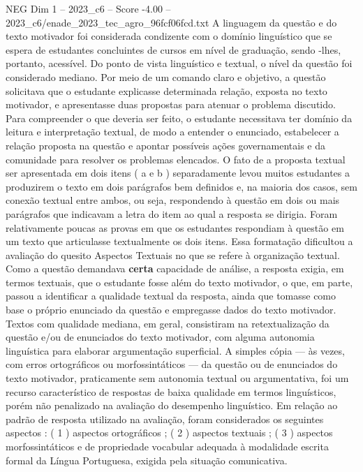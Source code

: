 \begin{textsample}{NEG Dim 1 – 2023\_c6 – Score -4.00 – 2023\_c6/enade\_2023\_tec\_agro\_96fcf06fcd.txt}
A linguagem da questão e do texto motivador foi considerada condizente com o domínio linguístico que se espera de estudantes concluintes de cursos em nível de graduação, sendo -lhes, portanto, acessível.
Do ponto de vista linguístico e textual, o nível da questão foi considerado mediano.
Por meio de um comando claro e objetivo, a questão solicitava que o estudante explicasse determinada relação, exposta no texto motivador, e apresentasse duas propostas para atenuar o problema discutido.
Para compreender o que deveria ser feito, o estudante necessitava ter domínio da leitura e interpretação textual, de modo a entender o enunciado, estabelecer a relação proposta na questão e apontar possíveis ações governamentais e da comunidade para resolver os problemas elencados.
O fato de a proposta textual ser apresentada em dois itens ( a e b ) separadamente levou muitos estudantes a produzirem o texto em dois parágrafos bem definidos e, na maioria dos casos, sem conexão textual entre ambos, ou seja, respondendo à questão em dois ou mais parágrafos que indicavam a letra do item ao qual a resposta se dirigia.
Foram relativamente poucas as provas em que os estudantes respondiam à questão em um texto que articulasse textualmente os dois itens.
Essa formatação dificultou a avaliação do quesito Aspectos Textuais no que se refere à organização textual.
Como a questão demandava \textbf{certa} capacidade de análise, a resposta exigia, em termos textuais, que o estudante fosse além do texto motivador, o que, em parte, passou a identificar a qualidade textual da resposta, ainda que tomasse como base o próprio enunciado da questão e empregasse dados do texto motivador.
Textos com qualidade mediana, em geral, consistiram na retextualização da questão e/ou de enunciados do texto motivador, com alguma autonomia linguística para elaborar argumentação superficial.
A simples cópia — às vezes, com erros ortográficos ou morfossintáticos — da questão ou de enunciados do texto motivador, praticamente sem autonomia textual ou argumentativa, foi um recurso característico de respostas de baixa qualidade em termos linguísticos, porém não penalizado na avaliação do desempenho linguístico.
Em relação ao padrão de resposta utilizado na avaliação, foram considerados os seguintes aspectos : ( 1 ) aspectos ortográficos ; ( 2 ) aspectos textuais ; ( 3 ) aspectos morfossintáticos e de propriedade vocabular adequada à modalidade escrita formal da Língua Portuguesa, exigida pela situação comunicativa.

\end{textsample}
